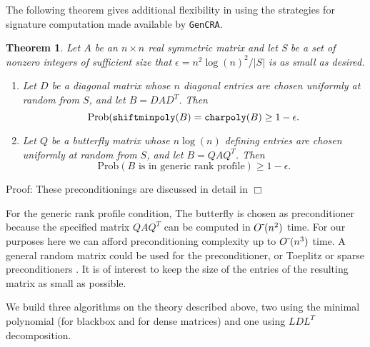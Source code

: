 \documentclass{acm_proc_article-sp}
\newcommand{\softO}{{O\mskip1mu\tilde{\,}\mskip1mu}}
\newcommand{\charpoly}[1]{\ensuremath{\mbox{\tt charpoly}(#1)}}
\newcommand{\shiftminpoly}[1]{\ensuremath{\mbox{\tt shiftminpoly}(#1)}}
\newcommand{\Prob}{\ensuremath{\mbox{Prob}}}
\newcommand{\QED}{\ensuremath{\Box}}
\newcommand{\abs}[1]{\ensuremath{|#1|}}
\newtheorem{theorem}{Theorem}
\begin{document}
The following theorem gives additional flexibility in using the strategies
for signature computation made available by {\tt GenCRA}.
\begin{theorem} {\label{theorem:random}}
Let $A$ be an $n\times n$ real symmetric matrix and let S be a set of nonzero
integers of sufficient size that $\epsilon = n^2 \log(n)^2/\abs{S}$ is as small as
desired.
\begin{enumerate}
\item
Let $D$ be a diagonal matrix whose $n$ diagonal entries are chosen
uniformly at random from $S$, 
and let $B = DAD^T$.  Then $$\Prob(\shiftminpoly{B} = \charpoly{B} \geq 1 - \epsilon.$$
\item
Let $Q$ be a butterfly matrix whose $n \log (n)$ defining entries are chosen
uniformly at random from $S$, 
and let $B=QAQ^T$.
Then $$\Prob(B \mbox{ is in generic rank profile}) \geq 1 - \epsilon.$$
\end{enumerate}
\end{theorem}

Proof:  These preconditionings are discussed in detail in \cite{CEKSTV02} \QED

For the generic rank profile condition, The butterfly is chosen as preconditioner
because the specified matrix $QAQ^T$ can be computed in $\softO(n^2)$ time.  
For our purposes here we can afford preconditioning complexity up to $\softO(n^3)$ time.
A general random matrix could be used for the preconditioner, or Toeplitz \cite{KS91} or sparse
preconditioners \cite[Section 6]{CEKSTV02}.
It is of interest to keep the size of the entries of the resulting matrix as small as
possible.

We build three algorithms on the theory described above, two using the minimal polynomial (for blackbox
and for dense matrices) and one using $LDL^T$ decomposition.
\end{document}
